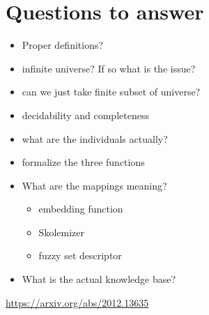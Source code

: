 \documentclass[]{article}
\begin{document}
\section{Questions to answer}

\begin{itemize}
	\item Proper definitions?
	\item infinite universe? If so what is the issue?
	\item can we just take finite subset of universe?
  \item decidability and completeness
\end{itemize}




\begin{itemize}
	\item what are the individuals actually?
	\item formalize the three functions
	\item What are the mappings meaning?
	\begin{itemize}
		\item embedding function
		\item Skolemizer
		\item fuzzy set descriptor
	\end{itemize}
	\item What is the actual knowledge base? 
	
\end{itemize}


\begin{thebibliography}{100}
	 \url{https://arxiv.org/abs/2012.13635}
\end{thebibliography}
\end{document}
